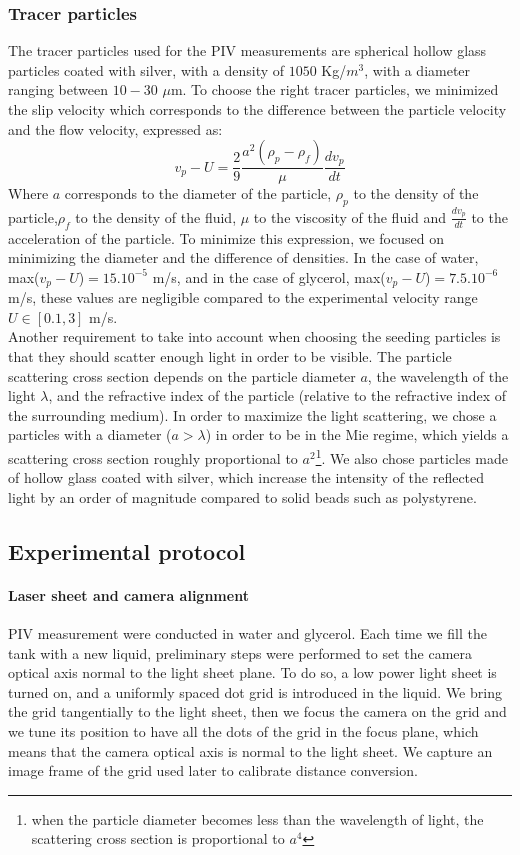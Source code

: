 \subsubsection{Tracer particles}
The tracer particles used for the PIV measurements are spherical hollow glass particles coated with silver, with a density of $1050$ Kg/$m^3$, with a diameter ranging between $10-30$ $\mu$m. To choose the right tracer particles, we minimized the slip velocity which corresponds to the difference between the particle velocity and the flow velocity\cite{PIV_springer}, expressed as:
\begin{equation*}
v_p−U = \frac{2}{9}\frac{a^2 (\rho_p−\rho_f )}{\mu}\frac{dv_p}{dt}
\label{eq:}
\end{equation*}  
Where $a$ corresponds to the diameter of the particle, $\rho_p$ to the density of the particle,$\rho_f$ to the density of the fluid, $\mu$ to the viscosity of the fluid and $\frac{dv_p}{dt}$ to the acceleration of the particle.
To minimize this expression, we focused on minimizing the diameter and the difference of densities. In the case of water, max($v_p−U$)$=15.10^{-5}$ m/s, and in the case of glycerol, max($v_p−U$)$=7.5.10^{-6}$ m/s, these values are negligible compared to the experimental velocity range $U \in [0.1,3]$ m/s.\\
Another requirement to take into account when choosing the seeding particles is that they should scatter enough light in order to be visible. The particle scattering cross section depends on the particle diameter $a$, the wavelength of the light $\lambda$, and the refractive index of the particle (relative
to the refractive index of the surrounding medium)\cite{PIV_springer}. In order to maximize the light scattering, we chose a particles with a diameter ($a >\lambda$) in order to be in the Mie regime, which yields a scattering cross section roughly proportional to $a^2$\footnote{when the particle diameter becomes less than the wavelength of light, the scattering cross section is proportional to $a^4$}. We also chose particles made of hollow glass coated with silver, which increase the intensity of the reflected light by an order of magnitude compared to solid beads such as polystyrene\cite{PIV_Wiley}.\\
\subsection{Experimental protocol}
\paragraph{Laser sheet and camera alignment}
PIV measurement were conducted in water and glycerol. Each time we fill the tank with a new liquid, preliminary steps were performed to set the camera optical axis normal to the light sheet plane. To do so, a low power light sheet is turned on,  and a uniformly spaced dot grid is introduced in the liquid. We bring the grid tangentially to the light sheet, then we focus the camera on the grid and we tune its position to have all the dots of the grid in the focus plane, which means that the camera optical axis is normal to the light sheet. We capture an image frame of the grid used later to calibrate distance conversion.
